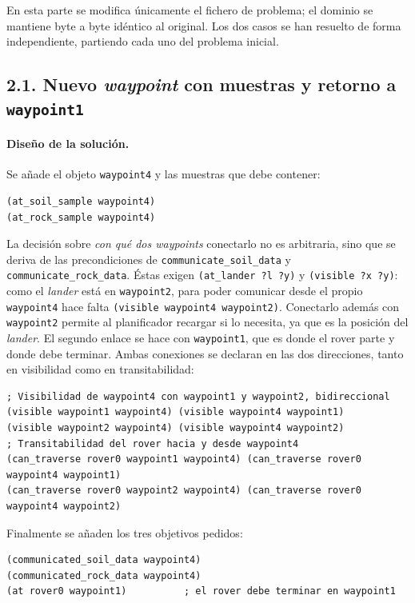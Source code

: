 \documentclass[12pt,a4paper]{article}
\begin{document}
En esta parte se modifica \'unicamente el fichero de problema; el dominio se
mantiene byte a byte id\'entico al original. Los dos casos se han resuelto de
forma independiente, partiendo cada uno del problema inicial.

\subsection{2.1. Nuevo \emph{waypoint} con muestras y retorno a
\texttt{waypoint1}}

\paragraph{Dise\~no de la soluci\'on.}
Se a\~nade el objeto \texttt{waypoint4} y las muestras que debe contener:

\begin{lstlisting}
(at_soil_sample waypoint4)
(at_rock_sample waypoint4)
\end{lstlisting}

La decisi\'on sobre \emph{con qu\'e dos waypoints} conectarlo no es
arbitraria, sino que se deriva de las precondiciones de
\texttt{communicate\_soil\_data} y \texttt{communicate\_rock\_data}. \'Estas
exigen \texttt{(at\_lander ?l ?y)} y \texttt{(visible ?x ?y)}: como el
\emph{lander} est\'a en \texttt{waypoint2}, para poder comunicar desde el
propio \texttt{waypoint4} hace falta \texttt{(visible waypoint4 waypoint2)}.
Conectarlo adem\'as con \texttt{waypoint2} permite al planificador recargar
si lo necesita, ya que es la posici\'on del \emph{lander}. El segundo enlace
se hace con \texttt{waypoint1}, que es donde el rover parte y donde debe
terminar. Ambas conexiones se declaran en las dos direcciones, tanto en
visibilidad como en transitabilidad:

\begin{lstlisting}
; Visibilidad de waypoint4 con waypoint1 y waypoint2, bidireccional
(visible waypoint1 waypoint4) (visible waypoint4 waypoint1)
(visible waypoint2 waypoint4) (visible waypoint4 waypoint2)
; Transitabilidad del rover hacia y desde waypoint4
(can_traverse rover0 waypoint1 waypoint4) (can_traverse rover0 waypoint4 waypoint1)
(can_traverse rover0 waypoint2 waypoint4) (can_traverse rover0 waypoint4 waypoint2)
\end{lstlisting}

Finalmente se a\~naden los tres objetivos pedidos:

\begin{lstlisting}
(communicated_soil_data waypoint4)
(communicated_rock_data waypoint4)
(at rover0 waypoint1)          ; el rover debe terminar en waypoint1
\end{lstlisting}
\end{document}
